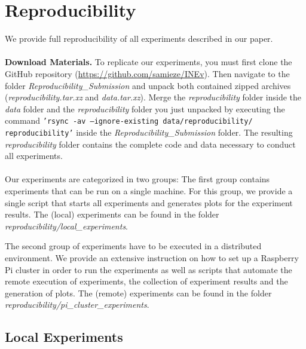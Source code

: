 \documentclass{article}
\begin{document}
\section{Reproducibility}
We provide full reproducibility of all experiments described in our paper. 
\\
\\
\textbf{Download Materials.} To replicate our experiments, you must first clone the GitHub repository (\url{https://github.com/samieze/INEv}). Then navigate to the folder \textit{Reproducibility\_Submission} and unpack both contained zipped archives (\textit{reproducibility.tar.xz} and \textit{data.tar.xz}). Merge the \textit{reproducibility} folder inside the \textit{data} folder and the \textit{reproducibility} folder you just unpacked by executing the command \texttt{'rsync -av --ignore-existing data/reproducibility/ \\ reproducibility'} inside the \textit{Reproducibility\_Submission} folder. The resulting \textit{reproducibility} folder contains the complete code and data necessary to conduct all experiments.
\\
\\
Our experiments are categorized in two groups: The first group contains experiments that can be run on a single machine. For this group, we provide a single script that starts all experiments and generates plots for the experiment  results. The (local) experiments can be found in the folder \textit{reproducibility/local\_experiments}. 

The second group of experiments have to be executed in a distributed environment. We provide an extensive instruction on how to set up a Raspberry Pi cluster in order to run the experiments as well as scripts that automate the remote execution of experiments, the collection of experiment results and the generation of plots. The (remote) experiments can be found in the folder \textit{reproducibility/pi\_cluster\_experiments}.


\subsection{Local Experiments}
\end{document}
